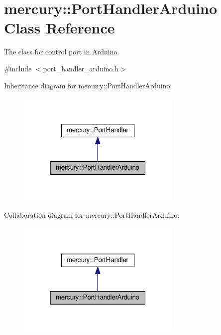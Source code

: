 \hypertarget{classmercury_1_1_port_handler_arduino}{}\section{mercury\+:\+:Port\+Handler\+Arduino Class Reference}
\label{classmercury_1_1_port_handler_arduino}


The class for control port in Arduino.  




{\ttfamily \#include $<$port\+\_\+handler\+\_\+arduino.\+h$>$}



Inheritance diagram for mercury\+:\+:Port\+Handler\+Arduino\+:\nopagebreak
\begin{figure}[H]
\begin{center}
\leavevmode
\includegraphics[width=223pt]{classmercury_1_1_port_handler_arduino__inherit__graph}
\end{center}
\end{figure}


Collaboration diagram for mercury\+:\+:Port\+Handler\+Arduino\+:\nopagebreak
\begin{figure}[H]
\begin{center}
\leavevmode
\includegraphics[width=223pt]{classmercury_1_1_port_handler_arduino__coll__graph}
\end{center}
\end{figure}
